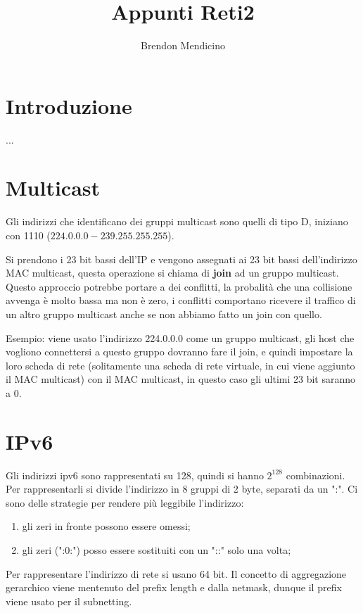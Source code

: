 \documentclass[12pt]{article}
\title{Appunti Reti2}
\author{Brendon Mendicino}
\begin{document}
\maketitle
\newpage
\tableofcontents
\newpage


\section{Introduzione}\label{sec:introduzione}
...


\section{Multicast}
Gli indirizzi che identificano dei gruppi multicast sono quelli di tipo D, iniziano con 1110 ($224.0.0.0 - 239.255.255.255$).

Si prendono i 23 bit bassi dell'IP e vengono assegnati ai 23 bit bassi dell'indirizzo MAC multicast, questa operazione si chiama di \textbf{join} ad un gruppo multicast. Questo approccio potrebbe portare a dei conflitti, la probalit\`a che una collisione avvenga \`e molto bassa ma non \`e zero, i conflitti comportano ricevere il traffico di un altro gruppo multicast anche se non abbiamo fatto un join con quello.

Esempio: viene usato l'indirizzo 224.0.0.0 come un gruppo multicast, gli host che vogliono connettersi a questo gruppo dovranno fare il join, e quindi impostare la loro scheda di rete (solitamente una scheda di rete virtuale, in cui viene aggiunto il MAC multicast) con il MAC multicast, in questo caso gli ultimi 23 bit saranno a 0.


\section{IPv6}
Gli indirizzi ipv6 sono rappresentati su 128, quindi si hanno $2^{128}$ combinazioni. Per rappresentarli si divide l'indirizzo in 8 gruppi di 2 byte, separati da un ":". Ci sono delle strategie per rendere pi\`u leggibile l'indirizzo:
\begin{enumerate}
    \item gli zeri in fronte possono essere omessi;
    \item gli zeri (":0:") posso essere sostituiti con un "::" solo una volta;
\end{enumerate}

Per rappresentare l'indirizzo di rete si usano 64 bit. Il concetto di aggregazione gerarchico viene mentenuto del prefix length e dalla netmask, dunque il prefix viene usato per il subnetting.
\end{document}
